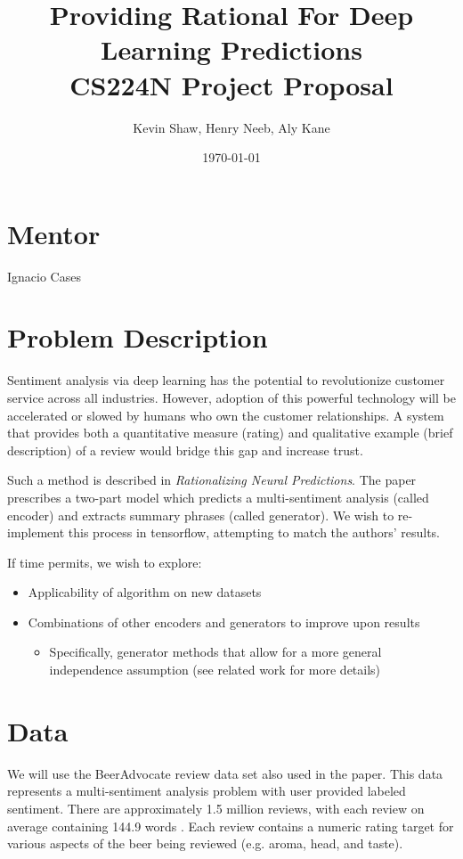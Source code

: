 \documentclass{article}
\title{Providing Rational For Deep Learning Predictions \\
CS224N Project Proposal}
\author{Kevin Shaw, Henry Neeb, Aly Kane}
\date{\today}
\begin{document}
\maketitle

\section*{Mentor}

Ignacio Cases

\section*{Problem Description}

Sentiment analysis via deep learning has the potential to revolutionize customer
service across all industries. However, adoption of this powerful technology
will be accelerated or slowed by humans who own the customer relationships. A
system that provides both a quantitative measure (rating) and qualitative
example (brief description) of a review would bridge this gap and increase
trust.

Such a method is described in \textit{Rationalizing Neural Predictions}. The
paper prescribes a two-part model which predicts a multi-sentiment analysis
(called encoder) and extracts summary phrases (called generator). We wish to re-
implement this process in tensorflow, attempting to match the authors' results.

If time permits, we wish to explore: 

\begin{itemize}
\item Applicability of algorithm on new datasets
\item Combinations of other encoders and generators to improve upon results
\begin{itemize}
\item Specifically, generator methods that allow for a more general independence assumption (see related work for more details)
\end{itemize}
\end{itemize}



\section*{Data}

We will use the BeerAdvocate review data set also used in the paper. This data
represents a multi-sentiment analysis problem with user provided labeled
sentiment. There are approximately 1.5 million reviews, with each review on
average containing 144.9 words \cite{Lei}. Each review contains a numeric rating
target for various aspects of the beer being reviewed (e.g. aroma, head, and
taste).
\end{document}
